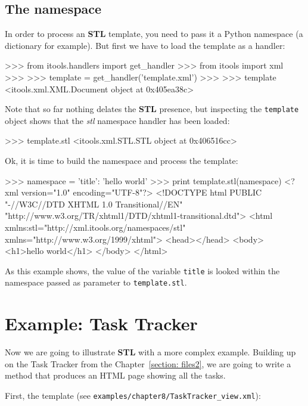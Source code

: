 \subsection{The namespace}

In order to process an {\bf STL} template, you need to pass it a Python
namespace (a dictionary for example). But first we have to load the template
as a handler:

\begin{code}
    >>> from itools.handlers import get_handler
    >>> from itools import xml
    >>>   
    >>> template = get_handler('template.xml')
    >>> 
    >>> template
    <itools.xml.XML.Document object at 0x405ea38c>
\end{code}

Note that so far nothing delates the {\bf STL} presence, but inspecting
the {\tt template} object shows that the {\em stl} namespace handler has
been loaded:

\begin{code}
    >>> template.stl
    <itools.xml.STL.STL object at 0x406516cc>
\end{code}

Ok, it is time to build the namespace and process the template:

\begin{code}
    >>> namespace = {'title': 'hello world'}
    >>> print template.stl(namespace)
    <?xml version="1.0" encoding="UTF-8"?>
    <!DOCTYPE html
         PUBLIC "-//W3C//DTD XHTML 1.0 Transitional//EN"
        "http://www.w3.org/TR/xhtml1/DTD/xhtml1-transitional.dtd">
    <html xmlns:stl="http://xml.itools.org/namespaces/stl"
          xmlns="http://www.w3.org/1999/xhtml">
      <head></head>
      <body>
        <h1>hello world</h1>
      </body>
    </html>
\end{code}


As this example shows, the value of the variable {\tt title} is looked within
the namespace passed as parameter to {\tt template.stl}.


\section{Example: Task Tracker}

Now we are going to illustrate {\bf STL} with a more complex example.
Building up on the Task Tracker from the Chapter~\ref{section: files2},
we are going to write a method that produces an HTML page showing all
the tasks.

First, the template (see {\tt examples/chapter8/TaskTracker\_view.xml}):

